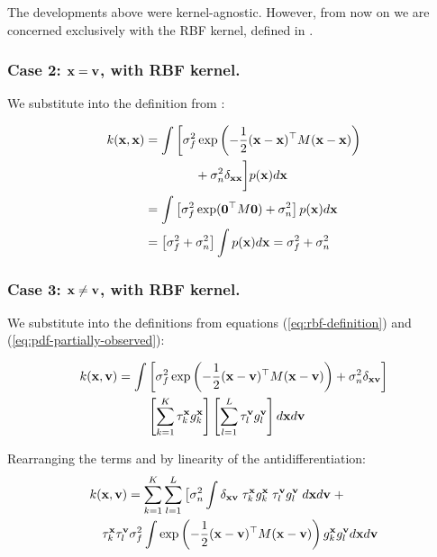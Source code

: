\documentclass[letterpaper]{article}
\newcommand{\tp}{\top}
\newcommand{\vx}{{\bf x}}
\newcommand{\vv}{{\bf v}}
\begin{document}
The developments above were kernel-agnostic. However, from now on we are
concerned exclusively with the \ac{RBF} kernel, defined in
.

\subsubsection{Case 2: $\vx=\vv$, with \ac{RBF} kernel.}
We substitute into  the definition from
:

\begin{equation*}
\begin{aligned}
 k(\vx, \vx) &= \int \bigg[\sigma_f^2 \exp\left( -\frac{1}{2}(\vx - \vx)^\tp M
     (\vx - \vx) \right) \\
   &\hspace{4em} + \sigma_n^2 \delta_{\vx\vx} \bigg] p(\vx) d\vx \\
 &= \int \left[ \sigma_f^2 \exp({\bf 0}^\tp M {\bf 0}) + \sigma_n^2 \right] p(\vx) d\vx \\
&= \left[ \sigma_f^2 + \sigma_n^2 \right] \int p(\vx) d\vx = \sigma_f^2 + \sigma_n^2
\end{aligned}
\end{equation*}


\subsubsection{Case 3: $\vx\neq\vv$, with \ac{RBF} kernel.}
We substitute into  the definitions from equations
(\ref{eq:rbf-definition}) and (\ref{eq:pdf-partially-observed}):

\begin{equation*}
\begin{aligned}
 k(\vx, \vv) = \int & \left[\sigma_f^2 \exp\left( -\frac{1}{2}(\vx - \vv)^\tp M (\vx - \vv) \right) + \sigma_n^2 \delta_{\vx\vv} \right] \\
 & \left[\sum_{k=1}^K \tau_k^\vx g_k^\vx \right]
 \left[\sum_{l=1}^L \tau_l^\vv g_l^\vv \right]
 d\vx d\vv
\end{aligned}
\end{equation*}

Rearranging the terms and by linearity of the antidifferentiation:
\begin{equation}
\begin{aligned}
  &k(\vx,\vv) = \sum_{k=1}^K \sum_{l=1}^L \big[\sigma_n^2 \int \delta_{\vx\vv} \; \tau^\vx_k g_k^\vx \; \tau^\vv_l g_l^\vv \; d\vx d\vv \; + \\
  &\hspace{1em}\tau^\vx_k \tau^\vv_l \sigma_f^2 \int \exp\left(-\frac{1}{2}(\vx-\vv)^\tp M (\vx-\vv)\right)
g_k^\vx g_l^\vv d\vx d\vv
\end{aligned}
\label{eq:kxv-2integrals}
\end{equation}
\end{document}
